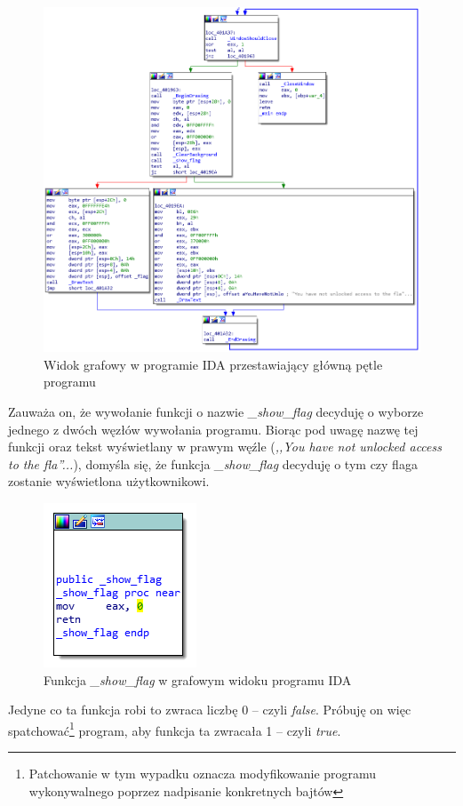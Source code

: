 \documentclass[language=polish,type=eng]{aghmodern}
\begin{document}
\begin{figure}[H]
\centering
\includegraphics[width=\textwidth]{200_ida_graph}
\caption{Widok grafowy w programie IDA przestawiający główną pętle programu}
\end{figure}

Zauważa on, że wywołanie funkcji o nazwie \emph{\_show\_flag} decyduję o wyborze jednego
z dwóch węzłów wywołania programu. Biorąc pod uwagę nazwę tej funkcji oraz tekst
wyświetlany w prawym węźle (\textit{,,You have not unlocked access to the fla''...}), domyśla
się, że funkcja \emph{\_show\_flag} decyduję o tym czy flaga zostanie wyświetlona użytkownikowi.

\begin{figure}[H]
\centering
\includegraphics{200_ida_show_flag}
\caption{Funkcja \emph{\_show\_flag} w grafowym widoku programu IDA}
\end{figure}

Jedyne co ta funkcja robi to zwraca liczbę 0 -- czyli \emph{false}.
Próbuję on więc spatchować\footnote{Patchowanie w tym wypadku oznacza modyfikowanie programu
wykonywalnego poprzez nadpisanie konkretnych bajtów}
program, aby funkcja ta zwracała 1 -- czyli \emph{true}.
\end{document}
